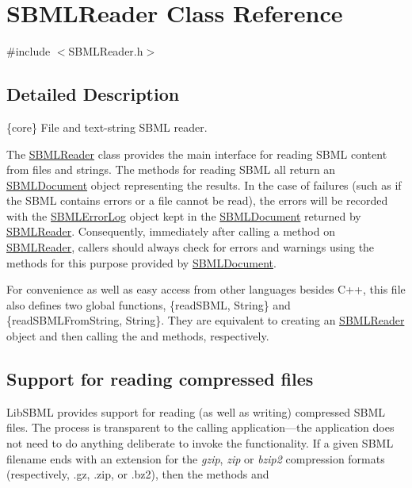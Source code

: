 \hypertarget{class_s_b_m_l_reader}{}\section{S\+B\+M\+L\+Reader Class Reference}
\label{class_s_b_m_l_reader}


{\ttfamily \#include $<$S\+B\+M\+L\+Reader.\+h$>$}



\subsection{Detailed Description}
\{core\} File and text-\/string S\+B\+ML reader.



The \hyperlink{class_s_b_m_l_reader}{S\+B\+M\+L\+Reader} class provides the main interface for reading S\+B\+ML content from files and strings. The methods for reading S\+B\+ML all return an \hyperlink{class_s_b_m_l_document}{S\+B\+M\+L\+Document} object representing the results. In the case of failures (such as if the S\+B\+ML contains errors or a file cannot be read), the errors will be recorded with the \hyperlink{class_s_b_m_l_error_log}{S\+B\+M\+L\+Error\+Log} object kept in the \hyperlink{class_s_b_m_l_document}{S\+B\+M\+L\+Document} returned by \hyperlink{class_s_b_m_l_reader}{S\+B\+M\+L\+Reader}. Consequently, immediately after calling a method on \hyperlink{class_s_b_m_l_reader}{S\+B\+M\+L\+Reader}, callers should always check for errors and warnings using the methods for this purpose provided by \hyperlink{class_s_b_m_l_document}{S\+B\+M\+L\+Document}.

For convenience as well as easy access from other languages besides C++, this file also defines two global functions, \{read\+S\+B\+ML, String\} and \{read\+S\+B\+M\+L\+From\+String, String\}. They are equivalent to creating an \hyperlink{class_s_b_m_l_reader}{S\+B\+M\+L\+Reader} object and then calling the and methods, respectively.\hypertarget{class_s_b_m_l_reader_compression}{}\subsection{Support for reading compressed files}\label{class_s_b_m_l_reader_compression}
Lib\+S\+B\+ML provides support for reading (as well as writing) compressed S\+B\+ML files. The process is transparent to the calling application---the application does not need to do anything deliberate to invoke the functionality. If a given S\+B\+ML filename ends with an extension for the {\itshape gzip}, {\itshape zip} or {\itshape bzip2} compression formats (respectively, {\ttfamily }.gz, {\ttfamily }.zip, or {\ttfamily }.bz2), then the methods and

